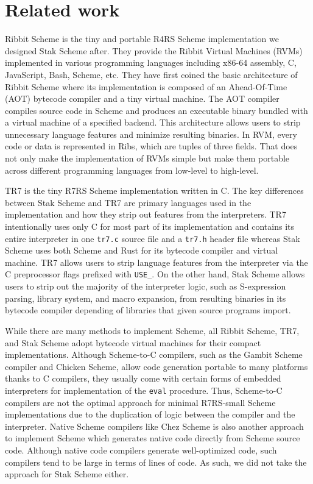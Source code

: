 \documentclass[sigplan, anonymous, review]{acmart}
\begin{document}
\section{Related work}

Ribbit Scheme \cite{ribbit2023} is the tiny and portable R4RS Scheme
implementation we designed Stak Scheme after. They provide
the Ribbit Virtual Machines (RVMs) implemented in various
programming languages
including x86-64 assembly, C, JavaScript, Bash, Scheme, etc.
They have first coined the basic architecture of Ribbit Scheme
\cite{ribbit2021} where its implementation is composed of an
Ahead-Of-Time (AOT) bytecode compiler and a tiny virtual machine.
The AOT compiler compiles source code in Scheme and produces
an executable binary bundled with a virtual machine of a specified backend.
This architecture allows users to strip unnecessary language
features and minimize resulting binaries.
In RVM, every code or data is represented in
Ribs, which are tuples of three fields.
That does not only make the implementation of
RVMs simple but make them portable across different
programming languages from low-level to high-level.

TR7 \cite{tr7} is the tiny R7RS Scheme implementation written in C.
The key differences between Stak Scheme and TR7 are primary languages used in
the implementation and how they strip out features from the
interpreters.
TR7 intentionally uses only C for most part of its implementation and
contains its entire interpreter in one \texttt{tr7.c} source file and a
\texttt{tr7.h} header file whereas Stak Scheme uses both Scheme and
Rust for its bytecode compiler and virtual machine.
TR7 allows users to strip language features from the interpreter via
the C preprocessor flags prefixed with \texttt{USE\_}.
On the other hand, Stak Scheme allows users to strip out the majority of
the interpreter logic, such as S-expression parsing, library system, and
macro expansion, from resulting binaries in its bytecode compiler
depending of libraries that given source programs import.

While there are many methods to implement Scheme, all Ribbit Scheme,
TR7, and Stak Scheme adopt bytecode virtual machines for their
compact implementations.
Although Scheme-to-C compilers, such as the Gambit Scheme compiler and
Chicken Scheme, allow code generation portable to many platforms
thanks to C compilers, they usually come with certain forms of embedded
interpreters for implementation of the \texttt{eval} procedure.
Thus, Scheme-to-C compilers are not the optimal approach for minimal
R7RS-small Scheme implementations due to the duplication of logic between the
compiler and the interpreter.
Native Scheme compilers like Chez Scheme is also another approach to
implement Scheme which generates native code directly from Scheme source code.
Although native code compilers generate well-optimized code, such
compilers tend to be large in terms of lines of code.
As such, we did not take the approach for Stak Scheme either.
\end{document}
